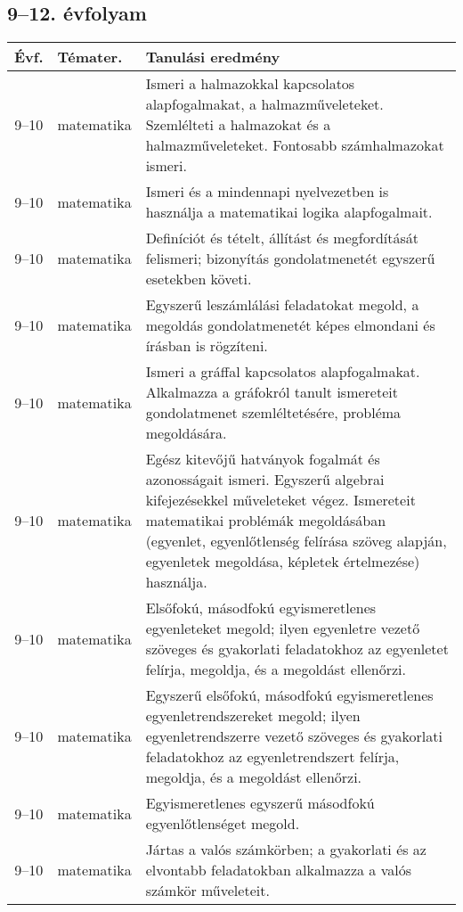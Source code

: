 \subsection{9--12. évfolyam}
\begin{small}
  \begin{longtable}{c | p{2cm} |  p{11cm} }
    \textbf{Évf.} & \textbf{Témater.} & \textbf{Tanulási eredmény} \\ \hline \hline
    \endhead

              9--10 & matematika & Ismeri a halmazokkal kapcsolatos alapfogalmakat, a halmazműveleteket. Szemlélteti a halmazokat és a halmazműveleteket. Fontosabb számhalmazokat ismeri. \\ \hline
              9--10 & matematika & Ismeri és a mindennapi nyelvezetben is használja a matematikai logika alapfogalmait. \\ \hline
              9--10 & matematika & Definíciót és tételt, állítást és megfordítását felismeri; bizonyítás gondolatmenetét egyszerű esetekben követi. \\ \hline
              9--10 & matematika & Egyszerű leszámlálási feladatokat megold, a megoldás gondolatmenetét képes elmondani és írásban is rögzíteni. \\ \hline
              9--10 & matematika & Ismeri a gráffal kapcsolatos alapfogalmakat. Alkalmazza a gráfokról tanult ismereteit gondolatmenet szemléltetésére, probléma megoldására. \\ \hline
              9--10 & matematika & Egész kitevőjű hatványok fogalmát és azonosságait ismeri. Egyszerű algebrai kifejezésekkel műveleteket végez. Ismereteit matematikai problémák megoldásában (egyenlet, egyenlőtlenség felírása szöveg alapján, egyenletek megoldása, képletek értelmezése) használja. \\ \hline
              9--10 & matematika & Elsőfokú, másodfokú egyismeretlenes egyenleteket megold; ilyen egyenletre vezető szöveges és gyakorlati feladatokhoz az egyenletet felírja, megoldja, és a megoldást ellenőrzi. \\ \hline
              9--10 & matematika & Egyszerű elsőfokú, másodfokú egyismeretlenes egyenletrendszereket megold; ilyen egyenletrendszerre vezető szöveges és gyakorlati feladatokhoz az egyenletrendszert felírja, megoldja, és a megoldást ellenőrzi. \\ \hline
              9--10 & matematika & Egyismeretlenes egyszerű másodfokú egyenlőtlenséget megold. \\ \hline
              9--10 & matematika & Jártas a valós számkörben; a gyakorlati és az elvontabb feladatokban alkalmazza a valós számkör műveleteit. \\ \hline

\end{longtable}
\end{small}
